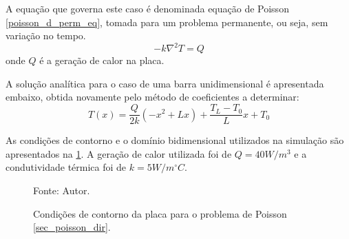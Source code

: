 A equação que governa este caso é denominada equação de Poisson \eqref{poisson_d_perm_eq}, tomada para um problema permanente, ou seja, sem variação no tempo.
\begin{equation}
    -k\nabla^2 T = Q
    \label{poisson_d_perm_eq} 
\end{equation}
onde $Q$ é a geração de calor na placa.

A solução analítica para o caso de uma barra unidimensional é apresentada embaixo, obtida novamente pelo método de coeficientes a determinar:
\begin{equation}
    T(x) = \dfrac{Q}{2k}\left(-x^2 + L x\right) + \dfrac{T_L-T_0}{L} x + T_0
    \label{poisson_d_sol} 
\end{equation}

As condições de contorno e o domínio bidimensional utilizados na simulação são apresentados na \ref{poisson_d_bc}.
A geração de calor utilizada foi de $Q = 40W/m^3$ e a condutividade térmica foi de $k=5 W/m^{\circ}C$.
\begin{figure}[H]
    \centering
     {\raggedleft \scriptsize Fonte: Autor.}
    \caption{Condições de contorno da placa para o problema de Poisson \ref{sec_poisson_dir}.}
    \label{poisson_d_bc}
\end{figure}

